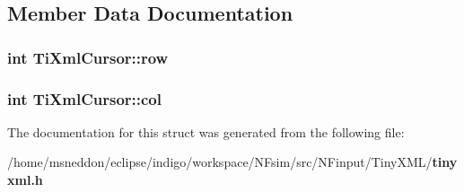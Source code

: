 \subsection{Member Data Documentation}
\subsubsection{\setlength{\rightskip}{0pt plus 5cm}int {\bf TiXmlCursor::row}}\label{structTiXmlCursor_5b54dd949820c2db061e2be41f3effb3}


\subsubsection{\setlength{\rightskip}{0pt plus 5cm}int {\bf TiXmlCursor::col}}\label{structTiXmlCursor_5694d7ed2c4d20109d350c14c417969d}




The documentation for this struct was generated from the following file:\begin{CompactItemize}
\item 
/home/msneddon/eclipse/indigo/workspace/NFsim/src/NFinput/TinyXML/{\bf tinyxml.h}\end{CompactItemize}
